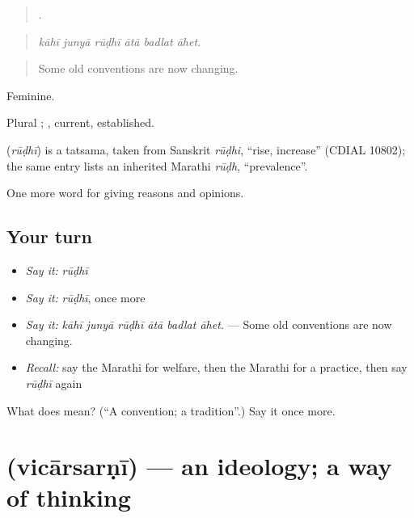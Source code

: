 \begin{quote}
     .
\end{quote}

\begin{quote}
\emph{kāhī junyā rūḍhī ātā badlat āhet.}
\end{quote}

\begin{quote}
Some old conventions are now changing.
\end{quote}

Feminine.

Plural ; , current, established.

\begin{cousinweb}
\textbf{} (\emph{rūḍhī}) is a tatsama, taken from Sanskrit \emph{rūḍhi}, \textquotedblleft{}rise, increase\textquotedblright{} (CDIAL 10802); the same entry lists an inherited Marathi \emph{rūḍh}, \textquotedblleft{}prevalence\textquotedblright{}.
\end{cousinweb}

\begin{grammarlens}[title={What you've built}]
One more word for giving reasons and opinions.
\end{grammarlens}

\subsection*{Your turn}
\begin{itemize}
\raggedright
  \item \emph{Say it:} \emph{rūḍhī}
  \item \emph{Say it:} \emph{rūḍhī}, once more
  \item \emph{Say it:} \emph{kāhī junyā rūḍhī ātā badlat āhet.} — Some old conventions are now changing.
  \item \emph{Recall:} say the Marathi for welfare, then the Marathi for a practice, then say \emph{rūḍhī} again
\end{itemize}

\begin{tcolorbox}[breakable,colback=teal!4,colframe=teal!35!black,title={Before you move on}]
What does  mean? (\textquotedblleft{}A convention; a tradition\textquotedblright{}.) Say it once more.
\end{tcolorbox}
\section[\texorpdfstring{\mr{विचारसरणी} (vicārsarṇī)}{विचारसरणी (vicārsarṇī)}]{ (vicārsarṇī) — an ideology; a way of thinking}

